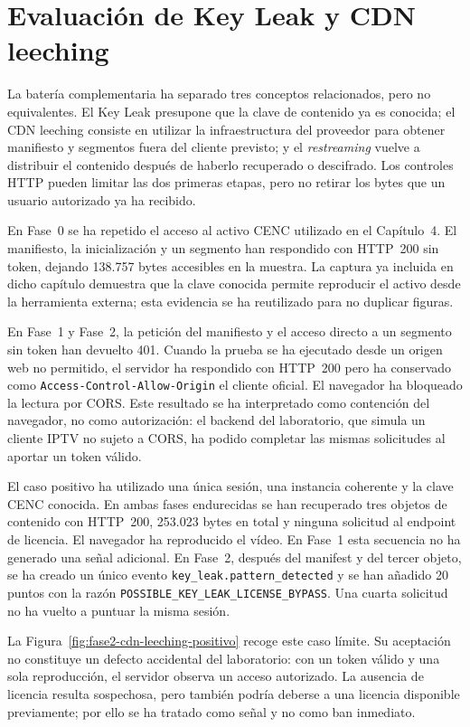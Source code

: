 \section{Evaluación de Key Leak y CDN leeching}

La batería complementaria ha separado tres conceptos relacionados, pero no equivalentes. El Key Leak presupone que la clave de contenido ya es conocida; el CDN leeching consiste en utilizar la infraestructura del proveedor para obtener manifiesto y segmentos fuera del cliente previsto; y el \textit{restreaming} vuelve a distribuir el contenido después de haberlo recuperado o descifrado. Los controles HTTP pueden limitar las dos primeras etapas, pero no retirar los bytes que un usuario autorizado ya ha recibido.

En Fase~0 se ha repetido el acceso al activo CENC utilizado en el Capítulo~4. El manifiesto, la inicialización y un segmento han respondido con HTTP~200 sin token, dejando 138.757 bytes accesibles en la muestra. La captura ya incluida en dicho capítulo demuestra que la clave conocida permite reproducir el activo desde la herramienta externa; esta evidencia se ha reutilizado para no duplicar figuras.

En Fase~1 y Fase~2, la petición del manifiesto y el acceso directo a un segmento sin token han devuelto 401. Cuando la prueba se ha ejecutado desde un origen web no permitido, el servidor ha respondido con HTTP~200 pero ha conservado como \nolinkurl{Access-Control-Allow-Origin} el cliente oficial. El navegador ha bloqueado la lectura por CORS. Este resultado se ha interpretado como contención del navegador, no como autorización: el backend del laboratorio, que simula un cliente IPTV no sujeto a CORS, ha podido completar las mismas solicitudes al aportar un token válido.

El caso positivo ha utilizado una única sesión, una instancia coherente y la clave CENC conocida. En ambas fases endurecidas se han recuperado tres objetos de contenido con HTTP~200, 253.023 bytes en total y ninguna solicitud al endpoint de licencia. El navegador ha reproducido el vídeo. En Fase~1 esta secuencia no ha generado una señal adicional. En Fase~2, después del manifest y del tercer objeto, se ha creado un único evento \nolinkurl{key_leak.pattern_detected} y se han añadido 20 puntos con la razón \nolinkurl{POSSIBLE_KEY_LEAK_LICENSE_BYPASS}. Una cuarta solicitud no ha vuelto a puntuar la misma sesión.

La Figura~\ref{fig:fase2-cdn-leeching-positivo} recoge este caso límite. Su aceptación no constituye un defecto accidental del laboratorio: con un token válido y una sola reproducción, el servidor observa un acceso autorizado. La ausencia de licencia resulta sospechosa, pero también podría deberse a una licencia disponible previamente; por ello se ha tratado como señal y no como ban inmediato.

